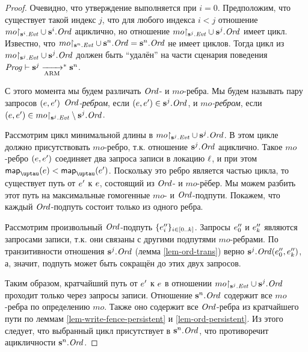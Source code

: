 \begin{proof}
  Очевидно, что утверждение выполняется при $i = 0$.
  Предположим, что существует такой индекс $j$, что для любого индекса $i < j$ отношение
  $mo{\restriction_{\mathbf{s}^i.\mathit{Evt}}} \cup \mathbf{s}^i.\mathit{Ord}$ ациклично, но
  отношение $mo{\restriction_{\mathbf{s}^j.\mathit{Evt}}} \cup \mathbf{s}^j.\mathit{Ord}$ имеет цикл.
  Известно, что $mo{\restriction_{\mathbf{s}^n.\mathit{Evt}}} \cup \mathbf{s}^n.\mathit{Ord} = \mathbf{s}^n.\mathit{Ord}$ не имеет циклов.
  Тогда цикл из $mo{\restriction_{\mathbf{s}^j.\mathit{Evt}}} \cup \mathbf{s}^j.\mathit{Ord}$ должен быть ``удалён''
  на части сценария поведения $\mathit{Prog} \vdash \mathbf{s}^j \xrightarrow[\text{ARM}]{}^{*} \mathbf{s}^n$.
  
  С этого момента мы будем различать $\mathit{Ord}$- и $mo$-ребра.
  Мы будем называть пару запросов $(e, e')$ \emph{$\mathit{Ord}$-ребром}, если $(e, e') \in \mathbf{s}^j.\mathit{Ord}$,
  и \emph{$mo$-ребром}, если $(e, e') \in mo{\restriction_{\mathbf{s}^j.\mathit{Evt}}} \setminus \mathbf{s}^j.\mathit{Ord}$.

Рассмотрим цикл минимальной длины в ${mo{\restriction_{\mathbf{s}^j.\mathit{Evt}}}} \cup \mathbf{s}^j.\mathit{Ord}$.
В этом цикле должно присутствовать $mo$-ребро, т.к. отношение $\mathbf{s}^j.\mathit{Ord}$ ациклично.
Такое $mo$-ребро $(e, e')$ соединяет два запроса записи в локацию $\ell$, %
и при этом $\taumapping(\e) < \taumapping(\e')$.
Поскольку это ребро является частью цикла, то существует путь от $e'$ к $e$, состоящий из
$\mathit{Ord}$- и $mo$-рёбер. Мы можем разбить этот путь на максимальные гомогенные $mo$- и $\mathit{Ord}$-подпути.
Покажем, что каждый $\mathit{Ord}$-подпуть состоит только из одного ребра.

Рассмотрим произвольный $\mathit{Ord}$-подпуть $\{e''_i\}_{i \in [0..k]}$.
Запросы $e''_0$ и $e''_k$ являются запросами записи, т.к. они связаны с другими подпутями
$mo$-ребрами.
По транзитивности отношения $\mathbf{s}^j.\mathit{Ord}$ (лемма \ref{lem-ord-trans})
верно $\mathbf{s}^j.\mathit{Ord}(e''_0, e''_k)$, а, значит, подпуть может быть сокращён до этих
двух запросов.

Таким образом, кратчайший путь от $e'$ к $e$ в отношении
${mo{\restriction_{\mathbf{s}^j.\mathit{Evt}}}} \cup \mathbf{s}^j.\mathit{Ord}$ проходит только через запросы записи.
Отношение $\mathbf{s}^n.\mathit{Ord}$ содержит все $mo$-ребра по определению $mo$. Также оно
содержит все $\mathit{Ord}$-ребра из кратчайшего пути по леммам \ref{lem-write-fence-persistent} и
\ref{lem-ord-persistent}. Из этого следует, что выбранный цикл присутствует в $\mathbf{s}^n.\mathit{Ord}$,
что противоречит ацикличности $\mathbf{s}^n.\mathit{Ord}$.
\end{proof}

